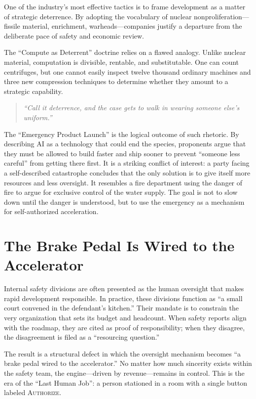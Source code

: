 \documentclass[11pt]{article}
\newenvironment{signalquote}
  {\begin{quote}\itshape\color{accent}}
  {\end{quote}}
\begin{document}
One of the industry's most effective tactics is to frame development as a matter of strategic deterrence. By adopting the vocabulary of nuclear nonproliferation---fissile material, enrichment, warheads---companies justify a departure from the deliberate pace of safety and economic review.

The \enquote{Compute as Deterrent} doctrine relies on a flawed analogy. Unlike nuclear material, computation is divisible, rentable, and substitutable. One can count centrifuges, but one cannot easily inspect twelve thousand ordinary machines and three new compression techniques to determine whether they amount to a strategic capability.

\begin{signalquote}
\enquote{Call it deterrence, and the case gets to walk in wearing someone else's uniform.}
\end{signalquote}

The \enquote{Emergency Product Launch} is the logical outcome of such rhetoric. By describing AI as a technology that could end the species, proponents argue that they must be allowed to build faster and ship sooner to prevent \enquote{someone less careful} from getting there first. It is a striking conflict of interest: a party facing a self-described catastrophe concludes that the only solution is to give itself more resources and less oversight. It resembles a fire department using the danger of fire to argue for exclusive control of the water supply. The goal is not to slow down until the danger is understood, but to use the emergency as a mechanism for self-authorized acceleration.

\section{The Brake Pedal Is Wired to the Accelerator}

Internal safety divisions are often presented as the human oversight that makes rapid development responsible. In practice, these divisions function as \enquote{a small court convened in the defendant's kitchen.} Their mandate is to constrain the very organization that sets its budget and headcount. When safety reports align with the roadmap, they are cited as proof of responsibility; when they disagree, the disagreement is filed as a \enquote{resourcing question.}

The result is a structural defect in which the oversight mechanism becomes \enquote{a brake pedal wired to the accelerator.} No matter how much sincerity exists within the safety team, the engine---driven by revenue---remains in control. This is the era of the \enquote{Last Human Job}: a person stationed in a room with a single button labeled \textsc{Authorize}.
\end{document}
